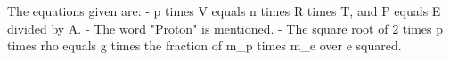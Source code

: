 The equations given are:
- p times V equals n times R times T, and P equals E divided by A.
- The word "Proton" is mentioned.
- The square root of 2 times p times rho equals g times the fraction of m_p times m_e over e squared.